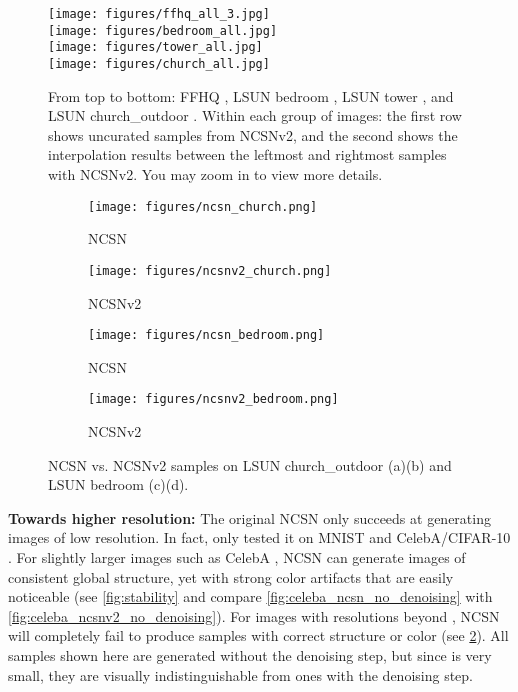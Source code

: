 \documentclass{article}
\begin{document}
\begin{figure}
    \centering
    \texttt{[image: figures/ffhq\_all\_3.jpg]}\\
    \texttt{[image: figures/bedroom\_all.jpg]}\\
    \texttt{[image: figures/tower\_all.jpg]}\\
    \texttt{[image: figures/church\_all.jpg]}
    \caption{From top to bottom: FFHQ , LSUN bedroom , LSUN tower , and LSUN church\_outdoor . Within each group of images: the first row shows uncurated samples from NCSNv2, and the second shows the interpolation results between the leftmost and rightmost samples with NCSNv2. You may zoom in to view more details.}
    \label{fig:large_samples}
\end{figure}
\begin{figure}
    \centering
    \begin{subfigure}[b]{0.23\textwidth}
        \texttt{[image: figures/ncsn\_church.png]}
        \caption{NCSN}
    \end{subfigure}
    \begin{subfigure}[b]{0.23\textwidth}
        \texttt{[image: figures/ncsnv2\_church.png]}
        \caption{NCSNv2}
    \end{subfigure}
    \begin{subfigure}[b]{0.23\textwidth}
        \texttt{[image: figures/ncsn\_bedroom.png]}
        \caption{NCSN}
    \end{subfigure}
    \begin{subfigure}[b]{0.23\textwidth}
        \texttt{[image: figures/ncsnv2\_bedroom.png]}
        \caption{NCSNv2}
    \end{subfigure}
    \caption{NCSN vs. NCSNv2 samples on LSUN church\_outdoor (a)(b) and LSUN bedroom (c)(d).}
    \label{fig:sample_compare}
\end{figure}
\textbf{Towards higher resolution:} The original NCSN only succeeds at generating images of low resolution. In fact, \cite{song2019generative} only tested it on MNIST  and CelebA/CIFAR-10 . For slightly larger images such as CelebA , NCSN can generate images of consistent global structure, yet with strong color artifacts that are easily noticeable (see \cref{fig:stability} and compare \cref{fig:celeba_ncsn_no_denoising} with \cref{fig:celeba_ncsnv2_no_denoising}). For images with resolutions beyond , NCSN will completely fail to produce samples with correct structure or color (see \cref{fig:sample_compare}). All samples shown here are generated without the denoising step, but since  is very small, they are visually indistinguishable from ones with the denoising step.
\end{document}
